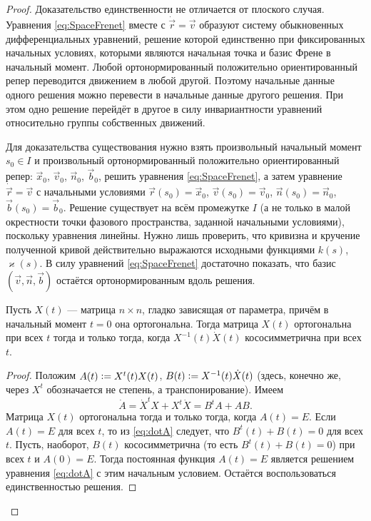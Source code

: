 \begin{proof}
	Доказательство единственности не отличается от плоского случая. Уравнения \eqref{eq:SpaceFrenet} вместе с $\dot{\vec{r}} = \vec{v}$ образуют систему обыкновенных дифференциальных уравнений, решение которой единственно при фиксированных начальных условиях, которыми являются начальная точка и базис Френе в начальный момент. Любой ортонормированный положительно ориентированный репер переводится движением в любой другой. Поэтому начальные данные одного решения можно перевести в начальные данные другого решения. При этом одно решение перейдёт в другое в силу инвариантности уравнений относительно группы собственных движений.

	Для доказательства существования нужно взять произвольный начальный момент $s_0 \in I$ и произвольный ортонормированный положительно ориентированный репер: $\vec{x}_0$, $\vec{v}_0$, $\vec{n}_0$, $\vec{b}_0$, решить уравнения \eqref{eq:SpaceFrenet}, а затем уравнение $\dot{\vec{r}} = \vec{v}$ с начальными условиями $\vec{r}(s_0) = \vec{x}_0$, $\vec{v}(s_0) = \vec{v}_0$, $\vec{n}(s_0) = \vec{n}_0$, $\vec{b}(s_0) = \vec{b}_0$. Решение существует на всём промежутке $I$ (а не только в малой окрестности точки фазового пространства, заданной начальными условиями), поскольку уравнения линейны. Нужно лишь проверить, что кривизна и кручение полученной кривой действительно выражаются исходными функциями $k(s)$, $\varkappa(s)$. В силу уравнений \eqref{eq:SpaceFrenet} достаточно показать, что базис $(\vec{v}, \vec{n}, \vec{b})$ остаётся ортонормированным вдоль решения.

	\begin{lemma} \label{lemma:FunnyMatrixLemma}
		Пусть $X(t)$ --- матрица $n \times n$, гладко зависящая от параметра, причём в начальный момент $t = 0$ она ортогональна. Тогда матрица $X(t)$ ортогональна при всех $t$ тогда и только тогда, когда $X^{-1}(t)\dot{X}(t)$ кососимметрична при всех $t$.
	\end{lemma}

	\begin{proof}
		Положим $A(t) \vcentcolon = X^t(t)X(t)$, $B(t) \vcentcolon = X^{-1}(t)\dot{X}(t)$ (здесь, конечно же, через $X^t$ обозначается не степень, а транспонирование). Имеем
		\begin{equation} \label{eq:dotA}
			\dot{A} = \dot{X}^t X + X^t\dot{X} = B^t A + AB.
		\end{equation}
		Матрица $X(t)$ ортогональна тогда и только тогда, когда $A(t) = E$. Если $A(t) = E$ для всех $t$, то из \eqref{eq:dotA} следует, что $B^t(t) + B(t) = 0$ для всех $t$. Пусть, наоборот, $B(t)$ кососимметрична (то есть $B^t(t) + B(t) = 0$) при всех $t$ и $A(0) = E$. Тогда постоянная функция $A(t) = E$ является решением уравнения \eqref{eq:dotA} с этим начальным условием. Остаётся воспользоваться единственностью решения.
	\end{proof}


\end{proof}
